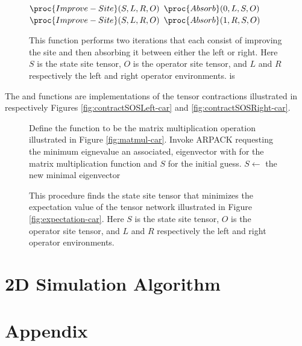 \documentclass{article}
\begin{document}
\begin{figure}
\begin{codebox}
\li $\proc{Improve-Site}(S,L,R,O)$
\li $\proc{Absorb}(0,L,S,O)$
\li $\proc{Improve-Site}(S,L,R,O)$
\li $\proc{Absorb}(1,R,S,O)$
\end{codebox}
\caption{\label{fig:Perform-Sweep} This function performs two iterations that each consist of improving the site and then absorbing it between either the left or right.  Here $S$ is the state site tensor, $O$ is the operator site tensor, and $L$ and $R$ respectively the left and right operator environments.   is }
\end{figure}

The  and  functions are implementations of the tensor contractions illustrated in respectively Figures \ref{fig:contractSOSLeft-car} and \ref{fig:contractSOSRight-car}.

\begin{figure}
\begin{codebox}
\li Define the function  to be the matrix multiplication operation
\zi illustrated in Figure \ref{fig:matmul-car}.
\li Invoke ARPACK requesting the minimum eignevalue an associated,
\zi eigenvector with  for the matrix multiplication function and
\zi $S$ for the initial guess.
\li $S \gets$ the new minimal eigenvector
\end{codebox}
\caption{This procedure finds the state site tensor that minimizes the expectation value of the tensor network illustrated in Figure \ref{fig:expectation-car}. Here $S$ is the state site tensor, $O$ is the operator site tensor, and $L$ and $R$ respectively the left and right operator environments.}
\end{figure}

\part{2D Simulation Algorithm}
\label{2dsim}

\part{Appendix}
\end{document}
